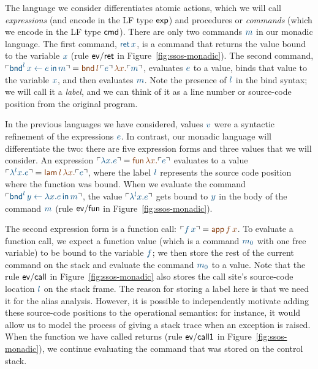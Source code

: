 The language we consider differentiates atomic actions, which we will
call {\it expressions} (and encode in the LF type ${\sf exp}$) and
procedures or {\it commands} (which we encode in the LF type ${\sf
  cmd}$). There are only two commands $\obj{m}$ in our monadic language. The
first command, $\obj{{\sf ret}\,x}$, is a command that returns the value
bound to the variable $\obj{x}$ (rule ${\sf ev/ret}$ in
Figure~\ref{fig:ssos-monadic}). The second command, $\interp{{\sf
    bnd}^l\, x \leftarrow e \,{\sf in}\,m} = \lf{{\sf
  bnd}\,l\,\interp{e}\,\lambda x.\interp{m}}$, evaluates $\obj{e}$ to a
value, binds that value to the variable $\obj{x}$, and then evaluates
$\obj{m}$. Note the presence of $\obj{l}$ 
in the bind syntax; we will call it a
{\it label}, and we can think of it as a line number or source-code
position from the original program.

In the previous languages we have considered, values $\obj{v}$ were a
syntactic refinement of the expressions $\obj{e}$. In contrast, our monadic
language will differentiate the two: there are five expression forms
and three values that we will consider. An expression $\interp{\lambda
  x.e} = \lf{{\sf fun}\,\lambda x.\interp{e}}$ evaluates to a value
$\interp{\lambda^l x.e} = \lf{{\sf lam}\,l\,\lambda x.\interp{e}}$, where
the label $\obj{l}$ represents the source code position where the function
was bound. When we evaluate the command $\interp{{\sf
    bnd}^l \, y \leftarrow \lambda x.e \,{\sf in}\,m}$, the value
$\interp{\lambda^l x.e}$ gets bound to $\obj{y}$ in the body of the command
$\obj{m}$ (rule ${\sf ev/fun}$ in Figure~\ref{fig:ssos-monadic}).

The second expression form is a function call: $\interp{f\,x} = \lf{{\sf
  app}\,f\,x}$. To evaluate a function call, we expect a function value
(which is a command $\obj{m_0}$ with one free variable) to be bound to the
variable $\obj{f}$; we then store the rest of the current command on the
stack and evaluate the command $\obj{m_0}$ to a value. Note that the rule
${\sf ev/call}$ in Figure~\ref{fig:ssos-monadic} also stores the call
site's source-code location $\obj{l}$ on the stack frame. The reason for
storing a label here is that we need it for the alias
analysis. However, it is possible to independently motivate adding
these source-code positions to the operational semantics: for instance, it
would allow us to model the process of giving a stack trace when an
exception is raised. When the function we have called returns (rule
${\sf ev/call1}$ in Figure~\ref{fig:ssos-monadic}), we continue
evaluating the command that was stored on the control stack.

